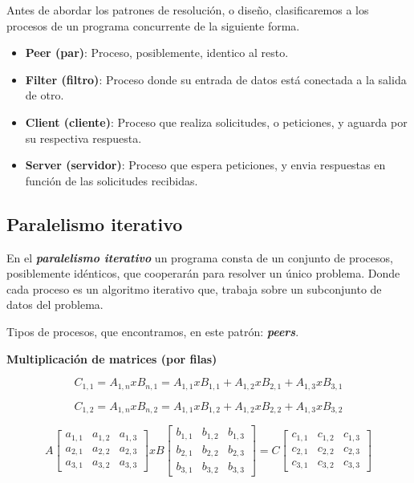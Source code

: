 \documentclass[a4paper, 10pt]{report}
\begin{document}
Antes de abordar los patrones de resolución, o diseño, clasificaremos a los procesos de un programa concurrente de la siguiente forma.

\begin{itemize}
    \item \textbf{Peer (par)}: Proceso, posiblemente, identico al resto.
    \item \textbf{Filter (filtro)}: Proceso donde su entrada de datos está conectada a la salida de otro.
    \item \textbf{Client (cliente)}: Proceso que realiza solicitudes, o peticiones, y aguarda por su respectiva respuesta.
    \item \textbf{Server (servidor)}: Proceso que espera peticiones, y envia respuestas en función de las solicitudes recibidas.
\end{itemize}

\subsection{Paralelismo iterativo}

En el \textbf{\emph{paralelismo iterativo}} un programa consta de un conjunto de procesos, posiblemente idénticos, que cooperarán para resolver un único problema. Donde cada proceso es un algoritmo iterativo que, trabaja sobre un subconjunto de datos del problema.

Tipos de procesos, que encontramos, en este patrón: \textbf{\emph{peers}}.

\textbf{Multiplicación de matrices (por filas)}

\begin{equation}
    C_{1,1} = A_{1,n} x B_{n,1} = A_{1,1} x B_{1,1} + A_{1,2} x B_{2,1} + A_{1,3} x B_{3,1}
\end{equation}

\begin{equation}
    C_{1,2} = A_{1,n} x B_{n,2} = A_{1,1} x B_{1,2} + A_{1,2} x B_{2,2} + A_{1,3} x B_{3,2}
\end{equation}

\begin{equation}
A\begin{bmatrix}
a_{1,1} & a_{1,2} & a_{1,3}\\
a_{2,1} & a_{2,2} & a_{2,3}\\
a_{3,1} & a_{3,2} & a_{3,3}
\end{bmatrix}
x
B\begin{bmatrix}
b_{1,1} & b_{1,2} & b_{1,3}\\
b_{2,1} & b_{2,2} & b_{2,3}\\
b_{3,1} & b_{3,2} & b_{3,3}
\end{bmatrix}
=
C\begin{bmatrix}
c_{1,1} & c_{1,2} & c_{1,3}\\
c_{2,1} & c_{2,2} & c_{2,3}\\
c_{3,1} & c_{3,2} & c_{3,3}
\end{bmatrix}
\end{equation}
\end{document}

